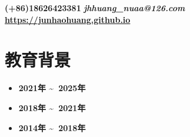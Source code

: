\documentclass[UTF8,AutoFakeBold]{resume}
\begin{document}
\hspace{0.25em}{\small{\textbullet}}\hspace{0.25em}
\faPhone \hspace{0.25em}\textbf{(+86)18626423381}
\hspace{0.25em}{\small{\textbullet}}\hspace{0.25em}
\faEnvelope \hspace{0.25em}\textbf{\textit{jhhuang\_nuaa@126.com}}\\
\hspace{0.25em} \faChain \hspace{0.25em}\textbf{\url{https://junhaohuang.github.io}}
\par
\vspace{3mm}

\section{\hspace{0.25em}\makebox[0.75em][c]{\faGraduationCap} \fangsong\textbf{教育背景}}
\begin{itemize}
\item {}
{\textbf{2021年 \textasciitilde \ 2025年}}
\item {}
{\textbf{2018年 \textasciitilde \ 2021年}}
\item {}
{\textbf{2014年 \textasciitilde \ 2018年}}
\end{itemize}
\end{document}
